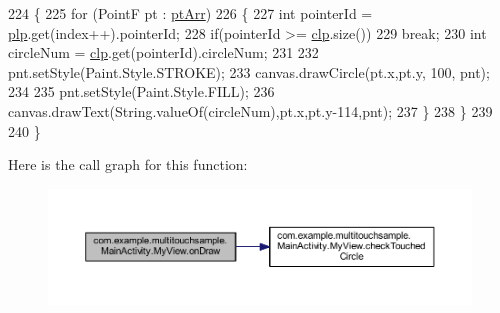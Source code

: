 \begin{DoxyCode}
224             \{           
225                 \textcolor{keywordflow}{for} (PointF pt : \hyperlink{classcom_1_1example_1_1multitouchsample_1_1_main_activity_1_1_my_view_ab2213518b7234955478ef54ebdd1db22}{ptArr})
226                 \{
227                     \textcolor{keywordtype}{int} pointerId = \hyperlink{classcom_1_1example_1_1multitouchsample_1_1_main_activity_1_1_my_view_a594a2fb9e001c0cfa1aa538c903bc3f8}{plp}.get(index++).pointerId;
228                     \textcolor{keywordflow}{if}(pointerId >= \hyperlink{classcom_1_1example_1_1multitouchsample_1_1_main_activity_1_1_my_view_a3bbc2d3fe569814080fe27c6c64eca77}{clp}.size())
229                         \textcolor{keywordflow}{break};                  
230                     \textcolor{keywordtype}{int} circleNum = \hyperlink{classcom_1_1example_1_1multitouchsample_1_1_main_activity_1_1_my_view_a3bbc2d3fe569814080fe27c6c64eca77}{clp}.get(pointerId).circleNum;
231                     
232                     pnt.setStyle(Paint.Style.STROKE);
233                     canvas.drawCircle(pt.x,pt.y, 100, pnt);
234     
235                     pnt.setStyle(Paint.Style.FILL);
236                     canvas.drawText(String.valueOf(circleNum),pt.x,pt.y-114,pnt);
237                 \}
238             \}
239             
240         \} 
\end{DoxyCode}


Here is the call graph for this function\+:
\nopagebreak
\begin{figure}[H]
\begin{center}
\leavevmode
\includegraphics[width=350pt]{classcom_1_1example_1_1multitouchsample_1_1_main_activity_1_1_my_view_a26704cac8a42993a73637404da71988e_cgraph}
\end{center}
\end{figure}


\hypertarget{classcom_1_1example_1_1multitouchsample_1_1_main_activity_1_1_my_view_ab2bf7ce103f9d65b6d677274d51a887e}{}
